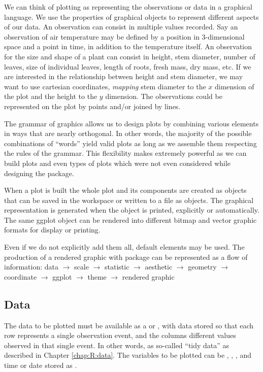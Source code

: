 \documentclass[krantz2]{krantz}\usepackage{knitr}%
\begin{document}
We can think of plotting as representing the observations or data in a graphical language. We use the properties of graphical objects to represent different aspects of our data. An observation can consist in multiple values recorded. Say an observation of air temperature may be defined by a position in 3-dimensional space and a point in time, in addition to the temperature itself. An observation for the size and shape of a plant can consist in height, stem diameter, number of leaves, size of individual leaves, length of roots, fresh mass, dry mass, etc. If we are interested in the relationship between height and stem diameter, we may want to use cartesian coordinates, \emph{mapping} stem diameter to the $x$ dimension of the plot and the height to the $y$ dimension. The observations could be represented on the plot by points and/or joined by lines.

The grammar of graphics allows us to design plots by combining various elements in ways that are nearly orthogonal. In other words, the majority of the possible combinations of ``words'' yield valid plots as long as we assemble them respecting the rules of the grammar. This flexibility makes \ggplot extremely powerful as we can build plots and even types of plots which were not even considered while designing the \ggplot package.

When a plot is built the whole plot and its components are created as \Rlang objects that can be saved in the workspace or written to a file as objects. The graphical representation is generated when the object is printed, explicitly or automatically. The same ggplot object can be rendered into different bitmap and vector graphic formats for display or printing.

Even if we do not explicitly add them all, default elements may be used. The production of a rendered graphic with package  can be represented as a flow of information:
\textsf{data $\to$ scale $\to$ statistic $\to$ aesthetic $\to$ geometry $\to$ coordinate $\to$ ggplot $\to$ theme $\to$ rendered graphic}

\subsection{Data}
The data to be plotted must be available as a  or , with data stored so that each row represents a single observation event, and the columns different values observed in that single event. In other words, as so-called ``tidy data'' as described in Chapter \ref{chap:R:data}. The variables to be plotted can be , , , and time or date stored as .
\end{document}
